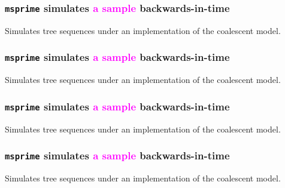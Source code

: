 \documentclass[11pt, mathserif, aspectratio=169]{beamer}
\newcommand{\magenta}[1]{\textcolor{magenta}{#1}}
\newenvironment{wideitemize}{\itemize\addtolength{\itemsep}{10pt}}{\enditemize}
\begin{document}
\begin{frame}
\frametitle{\texttt{msprime} simulates \magenta{a sample} backwards-in-time}
\begin{minipage}{.48\textwidth}

\end{minipage}\hfill
\begin{minipage}{.48\textwidth}
\begin{wideitemize}
\item Simulates tree sequences under an implementation of the coalescent model.
\end{wideitemize}
\end{minipage}
\end{frame}

\begin{frame}
\frametitle{\texttt{msprime} simulates \magenta{a sample} backwards-in-time}
\begin{minipage}{.48\textwidth}

\end{minipage}\hfill
\begin{minipage}{.48\textwidth}
\begin{wideitemize}
\item Simulates tree sequences under an implementation of the coalescent model.
\end{wideitemize}
\end{minipage}
\end{frame}

\begin{frame}
\frametitle{\texttt{msprime} simulates \magenta{a sample} backwards-in-time}
\begin{minipage}{.48\textwidth}

\end{minipage}\hfill
\begin{minipage}{.48\textwidth}
\begin{wideitemize}
\item Simulates tree sequences under an implementation of the coalescent model.
\end{wideitemize}
\end{minipage}
\end{frame}

\begin{frame}
\frametitle{\texttt{msprime} simulates \magenta{a sample} backwards-in-time}
\begin{minipage}{.48\textwidth}

\end{minipage}\hfill
\begin{minipage}{.48\textwidth}
\begin{wideitemize}
\item Simulates tree sequences under an implementation of the coalescent model.
\end{wideitemize}
\end{minipage}
\end{frame}
\end{document}
